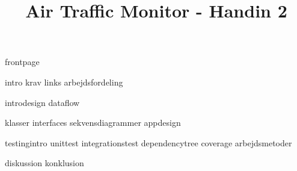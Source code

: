 \documentclass[a4paper]{article}								%
\title{Air Traffic Monitor - Handin 2}
\begin{document}

	{frontpage}

	\tableofcontents\thispagestyle{fancy} \newpage
	
	
	{intro}
	{krav}
	{links}
	{arbejdsfordeling}	

	{introdesign}
	{dataflow}
	
	{klasser}
	{interfaces}
	{sekvensdiagrammer}
	{appdesign}


	{testingintro}
	{unittest}
	{integrationstest}
	{dependencytree}
	{coverage}
	{arbejdsmetoder}

	{diskussion}
	{konklusion}
	

\end{document}
